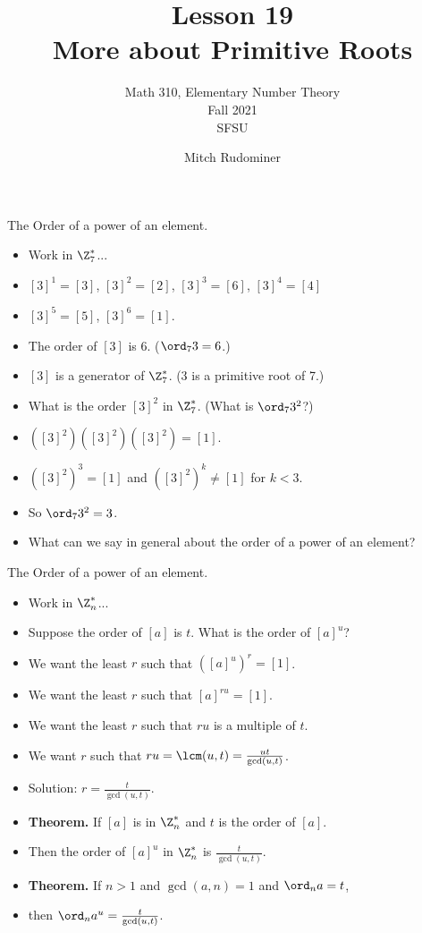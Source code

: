 \documentclass[handout]{beamer}
\title{Lesson 19 \\ More about Primitive Roots}
\subtitle{Math 310, Elementary Number Theory \\ Fall 2021 \\ SFSU}
\author{Mitch Rudominer}
\date{}
\begin{document}
\begin{frame}
  \titlepage
\end{frame}

\begin{frame}{The Order of a power of an element.}

\begin{itemize}
  \item Work in $\Z_7^*$...
  \item $[3]^1=[3]$, $[3]^2=[2]$, $[3]^3=[6]$, $[3]^4=[4]$
  \item $[3]^5=[5]$, $[3]^6=[1]$.
  \item The order of $[3]$ is $6$. ($\ord_7 3 = 6$.)
  \item $[3]$ is a generator of $\Z_7^*$. (3 is a primitive root of 7.)
  \item What is the order $[3]^2$ in $\Z_7^*$. (What is $\ord_7 3^2$?)
  \item $([3]^2)([3]^2)([3]^2)=[1]$.
  \item $([3]^2)^3 = [1]$ and $([3]^2)^k\not=[1]$ for $k<3$.
  \item So $\ord_7 3^2 = 3$.
  \item What can we say in general about the order of a power of an element?
\end{itemize}

\end{frame}

\begin{frame}{The Order of a power of an element.}

\begin{itemize}
  \item Work in $\Z_n^*$...
  \item Suppose the order of $[a]$ is $t$. What is the order of $[a]^u$?
  \item We want the least $r$ such that $([a]^u)^r = [1]$.
  \item We want the least $r$ such that $[a]^{ru} = [1]$.
  \item We want the least $r$ such that $ru$ is a multiple of $t$.
  \item We want $r$ such that $ru = \lcm(u,t) = \frac{ut}{\gcd(u,t)}$.
  \item Solution: $r=\frac{t}{\gcd(u,t)}$.
  \item \textbf{Theorem.} If $[a]$ is in $\Z_n^*$ and $t$ is the order of $[a]$.
  \item Then the order of $[a]^u$ in $\Z_n^*$ is $\frac{t}{\gcd(u,t)}$.
  \item \textbf{Theorem.} If $n>1$ and $\gcd(a,n)=1$ and $\ord_n a = t$,
  \item then $\ord_n a^u = \frac{t}{\gcd(u,t)}$.
\end{itemize}

\end{frame}
\end{document}
